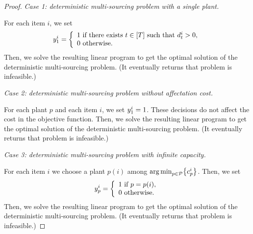 \begin{proof}
\emph{Case 1: deterministic multi-sourcing problem with a single plant.}

For each item $i$, we set
$$
\open_1^i=
\left\{
\begin{array}{l}
1\mbox{ if there exists }t\in\range{\horizon}\mbox{ such that }\demand_t^i>0,\\
0\mbox{ otherwise}.
\end{array}
\right.
$$
Then, we solve the resulting linear program to get the optimal solution of the deterministic multi-sourcing problem.
(It eventually returns that problem is infeasible.)

\medskip

\emph{Case 2: deterministic multi-sourcing problem without affectation cost.}

For each plant $p$ and each item $i$, we set $y_1^i=1$.
These decisions do not affect the cost in the objective function.
Then, we solve the resulting linear program to get the optimal solution of the deterministic multi-sourcing problem.
(It eventually returns that problem is infeasible.)

\medskip

\emph{Case 3: deterministic multi-sourcing problem with infinite capacity.}

For each item $i$ we choose a plant $p(i)$ among $\argmin_{p\in\plants}\crbracket{\affect_p^i}$.
Then, we set
$$
\open_p^i=
\left\{
\begin{array}{l}
1\mbox{ if }p=p(i),\\
0\mbox{ otherwise}.
\end{array}
\right.
$$
Then, we solve the resulting linear program to get the optimal solution of the deterministic multi-sourcing problem.
(It eventually returns that problem is infeasible.)
\end{proof}



